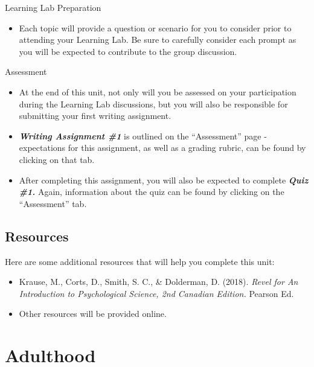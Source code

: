 \documentclass[
]{book}
\providecommand{\tightlist}{%
  \setlength{\itemsep}{0pt}\setlength{\parskip}{0pt}}
\begin{document}
\begin{reflect}
{Learning Lab Preparation}

\begin{itemize}
\tightlist
\item
  Each topic will provide a question or scenario for you to consider prior to attending your Learning Lab. Be sure to carefully consider each prompt as you will be expected to contribute to the group discussion.
\end{itemize}

{Assessment}

\begin{itemize}
\item
  At the end of this unit, not only will you be assessed on your participation during the Learning Lab discussions, but you will also be responsible for submitting your first writing assignment.
\item
  \textbf{\emph{Writing Assignment \#1}} is outlined on the ``Assessment'' page - expectations for this assignment, as well as a grading rubric, can be found by clicking on that tab.
\item
  After completing this assignment, you will also be expected to complete \textbf{\emph{Quiz \#1.}} Again, information about the quiz can be found by clicking on the ``Assessment'' tab.
\end{itemize}
\end{reflect}

\hypertarget{resources-5}{%
\subsection*{Resources}\label{resources-5}}

Here are some additional resources that will help you complete this unit:

\begin{itemize}
\tightlist
\item
  Krause, M., Corts, D., Smith, S. C., \& Dolderman, D. (2018). \emph{Revel for An Introduction to Psychological Science, 2nd Canadian Edition.} Pearson Ed.\\
\item
  Other resources will be provided online.
\end{itemize}

\hypertarget{adulthood}{%
\section{Adulthood}\label{adulthood}}
\end{document}
